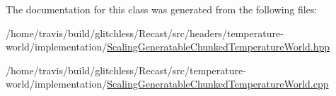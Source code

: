 The documentation for this class was generated from the following files\-:\begin{DoxyCompactItemize}
\item 
/home/travis/build/glitchless/\-Recast/src/headers/temperature-\/world/implementation/\hyperlink{_scaling_generatable_chunked_temperature_world_8hpp}{Scaling\-Generatable\-Chunked\-Temperature\-World.\-hpp}\item 
/home/travis/build/glitchless/\-Recast/src/temperature-\/world/implementation/\hyperlink{_scaling_generatable_chunked_temperature_world_8cpp}{Scaling\-Generatable\-Chunked\-Temperature\-World.\-cpp}\end{DoxyCompactItemize}
